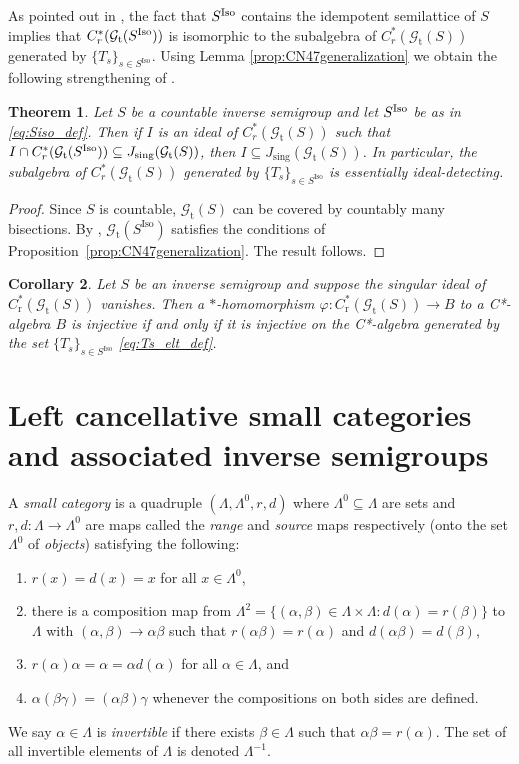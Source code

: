 \documentclass[12pt]{amsart}
\newtheorem{thm}{Theorem}[section]
\newtheorem{cor}[thm]{Corollary}
\theoremstyle{definition}
\theoremstyle{remark}
\numberwithin{equation}{section}
\renewcommand{\L}{\Lambda}
\renewcommand{\a}{\alpha}
\renewcommand{\b}{\beta}
\newcommand{\iso}{\text{Iso}}
\newcommand{\Cr}{C^*_{\text{r}}}
\newcommand{\gt}{\mathcal{G}_{\text{t}}}
\newcommand{\vp}{\varphi}
\newcommand{\Iso}{\textup{Iso}}
\newcommand{\Js}{J_{\text{sing}}}
\begin{document}
	
	
	

	
	
	As pointed out in \cite{St22}, the fact that $S^\Iso$ contains the idempotent semilattice of $S$ implies that $C^*_r(\gt(S^\Iso))$ is isomorphic to the subalgebra of $C^*_r(\gt(S))$ generated by $\{T_s\}_{s\in S^\iso}$. Using Lemma \ref{prop:CN47generalization} we obtain the following strengthening of \cite[Theorem~3.4]{St22}.
	
	\begin{thm}\label{thm:MainThm1}
				Let $S$ be a countable inverse semigroup and let $S^\Iso$ be as in \eqref{eq:Siso_def}. Then if $I$ is an ideal of $C^*_r(\gt(S))$ such that $I\cap C^*_r(\gt(S^\Iso))\subseteq \Js(\gt(S))$, then $I\subseteq \Js(\gt(S))$. In particular, the subalgebra of $C^*_r(\gt(S))$ generated by $\{T_s\}_{s\in S^\iso}$ is essentially ideal-detecting.
	\end{thm}
	\begin{proof}
		Since $S$ is countable, $\gt(S)$ can be covered by countably many bisections. By \cite[Proposition 3.3]{St22}, $\gt(S^\iso)$ satisfies the conditions of Proposition~\ref{prop:CN47generalization}. The result follows.
	\end{proof}
	\begin{cor}
		Let $S$ be an inverse semigroup and suppose the singular ideal of $\Cr(\gt(S))$ vanishes. Then a $*$-homomorphism $\vp: \Cr(\gt(S)) \to B$ to a C*-algebra $B$ is injective if and only if it is injective on the C*-algebra generated by the set $\{T_s\}_{s\in S^\iso}$ \eqref{eq:Ts_elt_def}.
	\end{cor}
	
	
	\section{Left cancellative small categories and associated inverse semigroups}
	
	A {\em small category} is a quadruple $(\L, \L^0, r,d)$ where $\L^0\subseteq\L$ are sets and $r, d:\L\to \L^0$ are maps called the {\em range} and {\em source} maps respectively (onto the set $\L^0$ of {\em objects}) satisfying the following:
	\begin{enumerate}
		\item $r(x) = d(x) = x$ for all $x\in \L^0$,
		\item there is a composition map from $\L^2 = \{(\a, \b)\in \L\times\L: d(\a) = r(\b)\}$ to $\L$ with $(\a,\b)\to \a\b$ such that $r(\a\b) = r(\a)$ and $d(\a\b) = d(\b)$,
		\item $r(\a)\a = \a = \a d(\a)$ for all $\a\in\L$, and
		\item $\a(\b\gamma) =(\a\b)\gamma$ whenever the compositions on both sides are defined.
	\end{enumerate}   
	We say $\a\in\L$ is {\em invertible} if there exists $\b\in\L$ such that $\a\b = r(\a)$. The set of all invertible elements of $\L$ is denoted $\L^{-1}$. 
	
\end{document}

